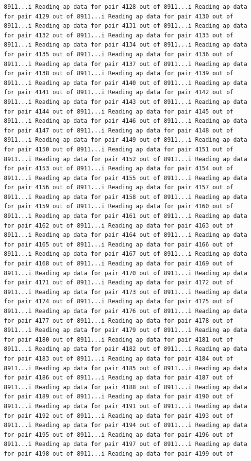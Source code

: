 \documentclass[
]{article}
\begin{document}
\begin{verbatim}
8911...i Reading ap data for pair 4128 out of 8911...i Reading ap data for pair 4129 out of 8911...i Reading ap data for pair 4130 out of 8911...i Reading ap data for pair 4131 out of 8911...i Reading ap data for pair 4132 out of 8911...i Reading ap data for pair 4133 out of 8911...i Reading ap data for pair 4134 out of 8911...i Reading ap data for pair 4135 out of 8911...i Reading ap data for pair 4136 out of 8911...i Reading ap data for pair 4137 out of 8911...i Reading ap data for pair 4138 out of 8911...i Reading ap data for pair 4139 out of 8911...i Reading ap data for pair 4140 out of 8911...i Reading ap data for pair 4141 out of 8911...i Reading ap data for pair 4142 out of 8911...i Reading ap data for pair 4143 out of 8911...i Reading ap data for pair 4144 out of 8911...i Reading ap data for pair 4145 out of 8911...i Reading ap data for pair 4146 out of 8911...i Reading ap data for pair 4147 out of 8911...i Reading ap data for pair 4148 out of 8911...i Reading ap data for pair 4149 out of 8911...i Reading ap data for pair 4150 out of 8911...i Reading ap data for pair 4151 out of 8911...i Reading ap data for pair 4152 out of 8911...i Reading ap data for pair 4153 out of 8911...i Reading ap data for pair 4154 out of 8911...i Reading ap data for pair 4155 out of 8911...i Reading ap data for pair 4156 out of 8911...i Reading ap data for pair 4157 out of 8911...i Reading ap data for pair 4158 out of 8911...i Reading ap data for pair 4159 out of 8911...i Reading ap data for pair 4160 out of 8911...i Reading ap data for pair 4161 out of 8911...i Reading ap data for pair 4162 out of 8911...i Reading ap data for pair 4163 out of 8911...i Reading ap data for pair 4164 out of 8911...i Reading ap data for pair 4165 out of 8911...i Reading ap data for pair 4166 out of 8911...i Reading ap data for pair 4167 out of 8911...i Reading ap data for pair 4168 out of 8911...i Reading ap data for pair 4169 out of 8911...i Reading ap data for pair 4170 out of 8911...i Reading ap data for pair 4171 out of 8911...i Reading ap data for pair 4172 out of 8911...i Reading ap data for pair 4173 out of 8911...i Reading ap data for pair 4174 out of 8911...i Reading ap data for pair 4175 out of 8911...i Reading ap data for pair 4176 out of 8911...i Reading ap data for pair 4177 out of 8911...i Reading ap data for pair 4178 out of 8911...i Reading ap data for pair 4179 out of 8911...i Reading ap data for pair 4180 out of 8911...i Reading ap data for pair 4181 out of 8911...i Reading ap data for pair 4182 out of 8911...i Reading ap data for pair 4183 out of 8911...i Reading ap data for pair 4184 out of 8911...i Reading ap data for pair 4185 out of 8911...i Reading ap data for pair 4186 out of 8911...i Reading ap data for pair 4187 out of 8911...i Reading ap data for pair 4188 out of 8911...i Reading ap data for pair 4189 out of 8911...i Reading ap data for pair 4190 out of 8911...i Reading ap data for pair 4191 out of 8911...i Reading ap data for pair 4192 out of 8911...i Reading ap data for pair 4193 out of 8911...i Reading ap data for pair 4194 out of 8911...i Reading ap data for pair 4195 out of 8911...i Reading ap data for pair 4196 out of 8911...i Reading ap data for pair 4197 out of 8911...i Reading ap data for pair 4198 out of 8911...i Reading ap data for pair 4199 out of 
\end{verbatim}
\end{document}
